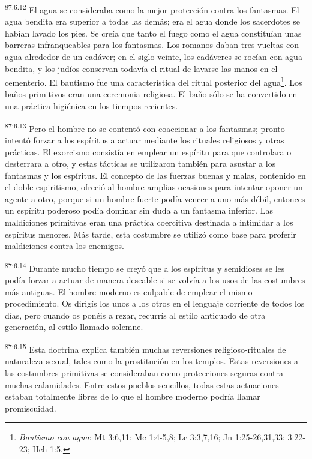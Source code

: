 \par
\textsuperscript{87:6.12} El agua se consideraba como la mejor protección contra los fantasmas. El agua bendita era superior a todas las demás; era el agua donde los sacerdotes se habían lavado los pies. Se creía que tanto el fuego como el agua constituían unas barreras infranqueables para los fantasmas. Los romanos daban tres vueltas con agua alrededor de un cadáver; en el siglo veinte, los cadáveres se rocían con agua bendita, y los judíos conservan todavía el ritual de lavarse las manos en el cementerio. El bautismo fue una característica del ritual posterior del agua\footnote{\textit{Bautismo con agua}: Mt 3:6,11; Mc 1:4-5,8; Lc 3:3,7,16; Jn 1:25-26,31,33; 3:22-23; Hch 1:5.}. Los baños primitivos eran una ceremonia religiosa. El baño sólo se ha convertido en una práctica higiénica en los tiempos recientes.

\par
\textsuperscript{87:6.13} Pero el hombre no se contentó con coaccionar a los fantasmas; pronto intentó forzar a los espíritus a actuar mediante los rituales religiosos y otras prácticas. El exorcismo consistía en emplear un espíritu para que controlara o desterrara a otro, y estas tácticas se utilizaron también para asustar a los fantasmas y los espíritus. El concepto de las fuerzas buenas y malas, contenido en el doble espiritismo, ofreció al hombre amplias ocasiones para intentar oponer un agente a otro, porque si un hombre fuerte podía vencer a uno más débil, entonces un espíritu poderoso podía dominar sin duda a un fantasma inferior. Las maldiciones primitivas eran una práctica coercitiva destinada a intimidar a los espíritus menores. Más tarde, esta costumbre se utilizó como base para proferir maldiciones contra los enemigos.

\par
\textsuperscript{87:6.14} Durante mucho tiempo se creyó que a los espíritus y semidioses se les podía forzar a actuar de manera deseable si se volvía a los usos de las costumbres más antiguas. El hombre moderno es culpable de emplear el mismo procedimiento. Os dirigís los unos a los otros en el lenguaje corriente de todos los días, pero cuando os ponéis a rezar, recurrís al estilo anticuado de otra generación, al estilo llamado solemne.

\par
\textsuperscript{87:6.15} Esta doctrina explica también muchas reversiones religioso-rituales de naturaleza sexual, tales como la prostitución en los templos. Estas reversiones a las costumbres primitivas se consideraban como protecciones seguras contra muchas calamidades. Entre estos pueblos sencillos, todas estas actuaciones estaban totalmente libres de lo que el hombre moderno podría llamar promiscuidad.


